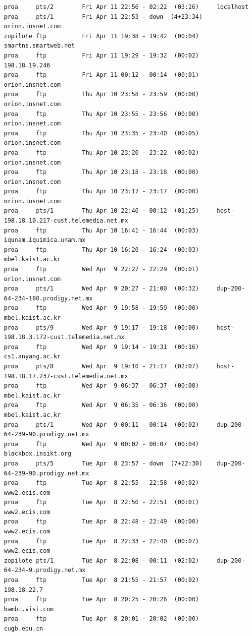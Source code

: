 \begin{lstlisting}[style=terminal]
proa     pts/2        Fri Apr 11 22:56 - 02:22  (03:26)     localhost
proa     pts/1        Fri Apr 11 22:53 - down  (4+23:34)    orion.insnet.com
zopilote ftp          Fri Apr 11 19:38 - 19:42  (00:04)     smartns.smartweb.net
proa     ftp          Fri Apr 11 19:29 - 19:32  (00:02)     198.18.19.246
proa     ftp          Fri Apr 11 00:12 - 00:14  (00:01)     orion.insnet.com
proa     ftp          Thu Apr 10 23:58 - 23:59  (00:00)     orion.insnet.com
proa     ftp          Thu Apr 10 23:55 - 23:56  (00:00)     orion.insnet.com
proa     ftp          Thu Apr 10 23:35 - 23:40  (00:05)     orion.insnet.com
proa     ftp          Thu Apr 10 23:20 - 23:22  (00:02)     orion.insnet.com
proa     ftp          Thu Apr 10 23:18 - 23:18  (00:00)     orion.insnet.com
proa     ftp          Thu Apr 10 23:17 - 23:17  (00:00)     orion.insnet.com
proa     pts/1        Thu Apr 10 22:46 - 00:12  (01:25)     host-198.18.10.217-cust.telemedia.net.mx
proa     ftp          Thu Apr 10 16:41 - 16:44  (00:03)     iqunam.iquimica.unam.mx
proa     ftp          Thu Apr 10 16:20 - 16:24  (00:03)     mbel.kaist.ac.kr
proa     ftp          Wed Apr  9 22:27 - 22:29  (00:01)     orion.insnet.com
proa     pts/1        Wed Apr  9 20:27 - 21:00  (00:32)     dup-200-64-234-180.prodigy.net.mx
proa     ftp          Wed Apr  9 19:58 - 19:59  (00:00)     mbel.kaist.ac.kr
proa     pts/9        Wed Apr  9 19:17 - 19:18  (00:00)     host-198.18.3.172-cust.telemedia.net.mx
proa     ftp          Wed Apr  9 19:14 - 19:31  (00:16)     cs1.anyang.ac.kr
proa     pts/8        Wed Apr  9 19:10 - 21:17  (02:07)     host-198.18.17.237-cust.telemedia.net.mx
proa     ftp          Wed Apr  9 06:37 - 06:37  (00:00)     mbel.kaist.ac.kr
proa     ftp          Wed Apr  9 06:35 - 06:36  (00:00)     mbel.kaist.ac.kr
proa     pts/1        Wed Apr  9 00:11 - 00:14  (00:02)     dup-200-64-239-90.prodigy.net.mx
proa     ftp          Wed Apr  9 00:02 - 00:07  (00:04)     blackbox.insikt.org
proa     pts/5        Tue Apr  8 23:57 - down  (7+22:30)    dup-200-64-239-90.prodigy.net.mx
proa     ftp          Tue Apr  8 22:55 - 22:58  (00:02)     www2.ecis.com
proa     ftp          Tue Apr  8 22:50 - 22:51  (00:01)     www2.ecis.com
proa     ftp          Tue Apr  8 22:48 - 22:49  (00:00)     www2.ecis.com
proa     ftp          Tue Apr  8 22:33 - 22:40  (00:07)     www2.ecis.com
zopilote pts/1        Tue Apr  8 22:08 - 00:11  (02:02)     dup-200-64-234-9.prodigy.net.mx
proa     ftp          Tue Apr  8 21:55 - 21:57  (00:02)     198.18.22.7
proa     ftp          Tue Apr  8 20:25 - 20:26  (00:00)     bambi.visi.com
proa     ftp          Tue Apr  8 20:01 - 20:02  (00:00)     cugb.edu.cn

\end{lstlisting}
